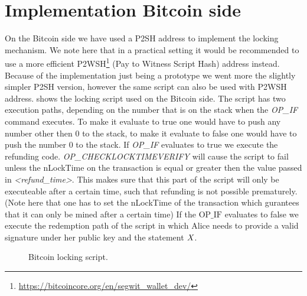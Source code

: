 \section{Implementation Bitcoin side}\label{sec:ImplementationBtc}

On the Bitcoin side we have used a P2SH address to implement the locking mechanism.
We note here that in a practical setting it would be recommended to use a more efficient P2WSH\footnote{\url{https://bitcoincore.org/en/segwit_wallet_dev/}} (Pay to Witness Script Hash) address instead.
Because of the implementation just being a prototype we went more the slightly simpler P2SH version, however the same script can also be used with P2WSH address.
 shows the locking script used on the Bitcoin side.
The script has two execution paths, depending on the number that is on the stack when the \textit{OP\_IF} command executes.
To make it evaluate to true one would have to push any number other then 0 to the stack, to make it evaluate to false one would have to push the number 0 to the stack.
If \textit{OP\_IF} evaluates to true we execute the refunding code.
\textit{OP\_CHECKLOCKTIMEVERIFY} will cause the script to fail unless the nLockTime on the transaction is equal or greater then the value passed in \textit{<refund\_time>}.
This makes sure that this part of the script will only be executeable after a certain time, such that refunding is not possible prematurely.
(Note here that one has to set the nLockTime of the transaction which gurantees that it can only be mined after a certain time)
If the $\text{OP\_IF}$ evaluates to false we execute the redemption path of the script in which Alice needs to provide a valid signature under her public key and the statement $\mathit{X}$.

\begin{figure}
    \caption{Bitcoin locking script.}\label{fig:bitcoin-script}
\end{figure}

